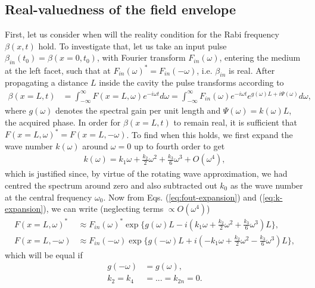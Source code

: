 \documentclass[onecolumn,secnumarabic,amssymb, nobibnotes, aip, prd]{revtex4-1}
\begin{document}
\subsection{Real-valuedness of the field envelope}
\label{subsec:sup-real}
First, let us consider when will the reality condition for the Rabi frequency $\beta(x,t)$  hold. To investigate that, let us take an input pulse $\beta_{in}(t_0) = \beta(x=0,t_0)$, with Fourier transform $F_{in}(\omega)$, entering the medium at the left facet, such that at $F_{in}(\omega)^* = F_{in}(-\omega)$, i.e. $\beta_{in}$ is real. After propagating a distance $L$ inside the cavity the pulse transforms according to \cite{weiner2011ultrafast}
\begin{align}
\label{eq:fout-expansion}
\beta(x=L,t) &= \int_{-\infty}^{\infty} F(x=L,\omega)e^{-i\omega t}d\omega = \int_{-\infty}^{\infty} F_{in}(\omega)e^{-i\omega t}e^{g(\omega)L+i\Psi(\omega)}d\omega,
\end{align}
where $g(\omega)$ denotes the spectral gain per unit length and $\Psi(\omega)=k(\omega)L$, the acquired phase. In order for $\beta(x=L,t)$ to remain real, it is sufficient that $F(x=L,\omega)^*= F(x=L,-\omega)$. To find when this holds, we first expand the wave number $k(\omega)$ around $\omega=0$ up to fourth order to get  
\begin{align}
\label{eq:k-expansion}
k(\omega) = k_1\omega + \frac{k_2}{2}\omega^2 + \frac{k_3}{6}\omega^3 + O(\omega^4), 
\end{align}
which is justified since, by virtue of the rotating wave approximation, we had centred the spectrum around zero and also subtracted out $k_0$ as the wave number at the central frequency $\omega_0$. Now from Eqs. (\ref{eq:fout-expansion}) and (\ref{eq:k-expansion}), we can write (neglecting terms $\propto O(\omega^4)$)
\begin{subequations}
	\begin{align}
	F(x=L,\omega)^* &\approx F_{in}(\omega)^* \exp\{g(\omega)L-i(k_1\omega + \frac{k_2}{2}\omega^2 + \frac{k_3}{6}\omega^3 )L\}, \\
	F(x=L,-\omega) &\approx F_{in}(-\omega) \exp\{g(-\omega)L+i(-k_1\omega + \frac{k_2}{2}\omega^2 - \frac{k_3}{6}\omega^3 )L\},
	\end{align}
\end{subequations}
which will be equal if
\begin{subequations}
	\begin{align}
	g(-\omega) &= g(\omega), \label{eq:symmetric-gain}\\
	k_2 = k_4 &= ... = k_{2n}=0. \label{eq:vanish-even-order-dispersion}
	\end{align}
\end{subequations}
\end{document}
